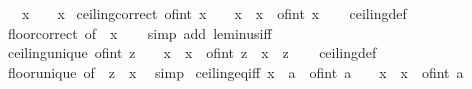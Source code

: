 \begin{isabellebody}
\ \ \ {\isachardoublequoteopen}{\isasymlceil}x{\isasymrceil}\ {\isacharequal}{\kern0pt}\ {\isacharminus}{\kern0pt}\ {\isasymlfloor}{\isacharminus}{\kern0pt}\ x{\isasymrfloor}{\isachardoublequoteclose}\isanewline
\isanewline
{}\isamarkupfalse%
\ ceiling{\isacharunderscore}{\kern0pt}correct{\isacharcolon}{\kern0pt}\ {\isachardoublequoteopen}of{\isacharunderscore}{\kern0pt}int\ {\isasymlceil}x{\isasymrceil}\ {\isacharminus}{\kern0pt}\ {}\ {\isacharless}{\kern0pt}\ x\ {\isasymand}\ x\ {\isasymle}\ of{\isacharunderscore}{\kern0pt}int\ {\isasymlceil}x{\isasymrceil}{\isachardoublequoteclose}\isanewline
%
\isadelimproof
\ \ %
\endisadelimproof
%
\isatagproof
{}\isamarkupfalse%
\ ceiling{\isacharunderscore}{\kern0pt}def\ \isamarkupfalse%
\ floor{\isacharunderscore}{\kern0pt}correct\ {\isacharbrackleft}{\kern0pt}of\ {\isachardoublequoteopen}{\isacharminus}{\kern0pt}\ x{\isachardoublequoteclose}{\isacharbrackright}{\kern0pt}\isanewline
\ \ \isamarkupfalse%
\ {\isacharparenleft}{\kern0pt}simp\ add{\isacharcolon}{\kern0pt}\ le{\isacharunderscore}{\kern0pt}minus{\isacharunderscore}{\kern0pt}iff{\isacharparenright}{\kern0pt}%
\endisatagproof
{\isafoldproof}%
%
\isadelimproof
\isanewline
%
\endisadelimproof
\isanewline
{}\isamarkupfalse%
\ ceiling{\isacharunderscore}{\kern0pt}unique{\isacharcolon}{\kern0pt}\ {\isachardoublequoteopen}of{\isacharunderscore}{\kern0pt}int\ z\ {\isacharminus}{\kern0pt}\ {}\ {\isacharless}{\kern0pt}\ x\ {\isasymLongrightarrow}\ x\ {\isasymle}\ of{\isacharunderscore}{\kern0pt}int\ z\ {\isasymLongrightarrow}\ {\isasymlceil}x{\isasymrceil}\ {\isacharequal}{\kern0pt}\ z{\isachardoublequoteclose}\isanewline
%
\isadelimproof
\ \ %
\endisadelimproof
%
\isatagproof
{}\isamarkupfalse%
\ ceiling{\isacharunderscore}{\kern0pt}def\ \isamarkupfalse%
\ floor{\isacharunderscore}{\kern0pt}unique\ {\isacharbrackleft}{\kern0pt}of\ {\isachardoublequoteopen}{\isacharminus}{\kern0pt}\ z{\isachardoublequoteclose}\ {\isachardoublequoteopen}{\isacharminus}{\kern0pt}\ x{\isachardoublequoteclose}{\isacharbrackright}{\kern0pt}\ \isamarkupfalse%
\ simp%
\endisatagproof
{\isafoldproof}%
%
\isadelimproof
\isanewline
%
\endisadelimproof
\isanewline
{}\isamarkupfalse%
\ ceiling{\isacharunderscore}{\kern0pt}eq{\isacharunderscore}{\kern0pt}iff{\isacharcolon}{\kern0pt}\ {\isachardoublequoteopen}{\isasymlceil}x{\isasymrceil}\ {\isacharequal}{\kern0pt}\ a\ {\isasymlongleftrightarrow}\ of{\isacharunderscore}{\kern0pt}int\ a\ {\isacharminus}{\kern0pt}\ {}\ {\isacharless}{\kern0pt}\ x\ {\isasymand}\ x\ {\isasymle}\ of{\isacharunderscore}{\kern0pt}int\ a{\isachardoublequoteclose}\isanewline

\end{isabellebody}
